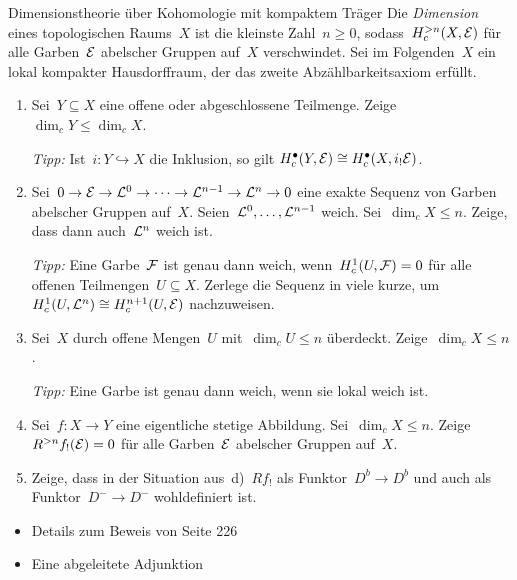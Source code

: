 \documentclass{uebblatt}
\begin{document}
\begin{aufgabe}{Dimensionstheorie über Kohomologie mit kompaktem Träger}
Die \emph{Dimension} eines topologischen Raums~$X$ ist die kleinste Zahl~$n
\geq 0$, sodass~$H_c^{> n}(X,\mathcal{E})$ für alle Garben~$\mathcal{E}$ abelscher Gruppen
auf~$X$ verschwindet. Sei im Folgenden~$X$ ein lokal kompakter Hausdorffraum,
der das zweite Abzählbarkeitsaxiom erfüllt.
\begin{enumerate}
\item Sei~$Y \subseteq X$ eine offene oder abgeschlossene Teilmenge.
Zeige~$\dim_c Y \leq \dim_c X$.

{\tiny\emph{Tipp:} Ist~$i : Y \hookrightarrow X$ die Inklusion, so gilt
$H_c^\bullet(Y,\mathcal{E}) \cong H_c^\bullet(X,i_! \mathcal{E})$.\par}
\item Sei~$0 \to \mathcal{E} \to \mathcal{L}^0 \to \cdots \to \mathcal{L}^{n-1} \to \mathcal{L}^n \to 0$ eine
exakte Sequenz von Garben abelscher Gruppen auf~$X$.
Seien~$\mathcal{L}^0,\ldots,\mathcal{L}^{n-1}$ weich. Sei~$\dim_c X \leq n$. Zeige, dass dann
auch~$\mathcal{L}^n$ weich ist.

{\tiny\emph{Tipp:} Eine Garbe~$\mathcal{F}$ ist genau dann weich, wenn~$H^1_c(U,\mathcal{F}) = 0$
für alle offenen Teilmengen~$U \subseteq X$. Zerlege die Sequenz in viele
kurze, um~$H^1_c(U,\mathcal{L}^n) \cong H^{n+1}_c(U,\mathcal{E})$ nachzuweisen.\par}
\item Sei~$X$ durch offene Mengen~$U$ mit~$\dim_c U \leq
n$ überdeckt. Zeige~$\dim_c X \leq n$.

{\tiny\emph{Tipp:} Eine Garbe ist genau dann weich, wenn sie lokal weich
ist.\par}
\item Sei~$f : X \to Y$ eine eigentliche stetige Abbildung. Sei~$\dim_c X \leq n$.
Zeige~$R^{> n} f_!(\mathcal{E}) = 0$ für alle Garben~$\mathcal{E}$ abelscher Gruppen auf~$X$.
\item Zeige, dass in der Situation aus~d)~$Rf_!$ als Funktor~$D^b \to D^b$ und
auch als Funktor~$D^- \to D^-$ wohldefiniert ist.
\end{enumerate}
\end{aufgabe}

\begin{itemize}
\item Details zum Beweis von Seite 226
\item Eine abgeleitete Adjunktion
\end{itemize}
\end{document}
